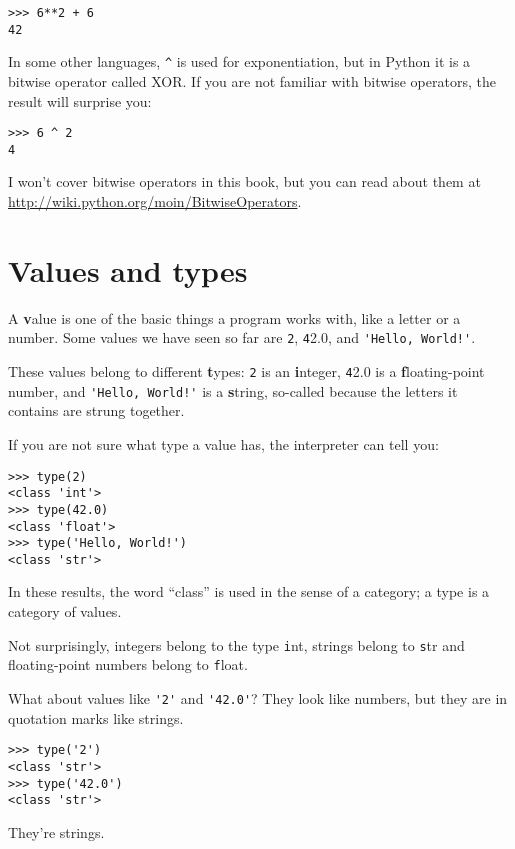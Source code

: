 \documentclass[
DIV=11,
fontsize=12,
twoside,
headinclude=false,
titlepage=firstiscover,
abstract=true,
headsepline=true,
footsepline=true,
chapterprefix=true, %
headings=big,
bibliography=totoc,%
captions=tableheading
]{scrbook}
\theoremstyle{definition}
\begin{document}
\begin{lstlisting}
>>> 6**2 + 6
42
\end{lstlisting}
%
In some other languages, \verb"^" is used for exponentiation, but
in Python it is a bitwise operator called XOR.  If you are not
familiar with bitwise operators, the result will surprise you:

\begin{lstlisting}
>>> 6 ^ 2
4
\end{lstlisting}
%
I won't cover
bitwise operators in this book, but you can read about
them at \url{http://wiki.python.org/moin/BitwiseOperators}.


\section{Values and types}

A {\textbf value} is one of the basic things a program works with, like a
letter or a number.  Some values we have seen so far are {\texttt 2},
{\texttt 42.0}, and \verb"'Hello, World!'".

These values belong to different {\textbf types}:
{\texttt 2} is an {\textbf integer}, {\texttt 42.0} is a {\textbf floating-point number},
and \verb"'Hello, World!'" is a {\textbf string},
so-called because the letters it contains are strung together.

If you are not sure what type a value has, the interpreter can
tell you:

\begin{lstlisting}
>>> type(2)
<class 'int'>
>>> type(42.0)
<class 'float'>
>>> type('Hello, World!')
<class 'str'>
\end{lstlisting}
%
In these results, the word ``class'' is used in the sense of
a category; a type is a category of values.

Not surprisingly, integers belong to the type {\texttt int},
strings belong to {\texttt str} and floating-point
numbers belong to {\texttt float}.  

What about values like \verb"'2'" and \verb"'42.0'"?
They look like numbers, but they are in quotation marks like
strings.

\begin{lstlisting}
>>> type('2')
<class 'str'>
>>> type('42.0')
<class 'str'>
\end{lstlisting}
%
They're strings.
\end{document}
